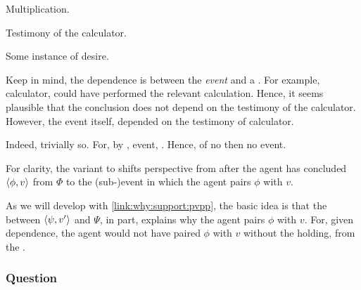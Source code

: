 \begin{note}
  Multiplication.

  Testimony of the calculator.

  Some instance of desire.

  Keep in mind, the dependence is between the \emph{event} and a \ros{}.
  For example, calculator, could have performed the relevant calculation.
  Hence, it seems plausible that the conclusion does not depend on the testimony of the calculator.
  However, the event itself, depended on the testimony of calculator.

  Indeed, trivially so.
  For, by \supportI{}, event, \ros{}.
  Hence, of no \ros{} then no event.
\end{note}

\begin{note}
  For clarity, the variant to \qWhy{} shifts perspective from after the agent has concluded \(\langle \phi, v \rangle\) from \(\Phi\) to the (sub-)event in which the agent pairs \(\phi\) with \(v\).

  As we will develop with \autoref{link:why:support:pvpp}, the basic idea is that the \ros{} between \(\langle \psi, v' \rangle\) and \(\Psi\), in part, explains why the agent pairs \(\phi\) with \(v\).
  For, given dependence, the agent would not have paired \(\phi\) with \(v\) without the \ros{} holding, from the \agpe{}.
\end{note}

\subsubsection{Question}
\label{cha:var:sec:vars:qwhyvnp:question}

